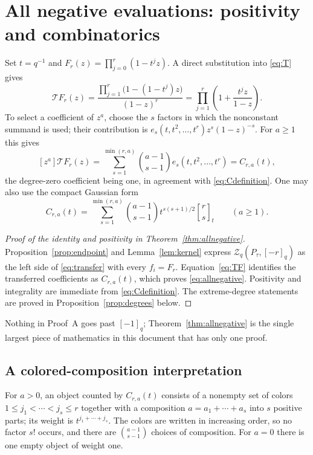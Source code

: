 \documentclass[11pt]{article}
\numberwithin{equation}{section}
\theoremstyle{definition}
\theoremstyle{remark}
\newcommand{\Tr}{\mathcal T}
\newcommand{\qint}[1]{[#1]_q}
\newcommand{\Zeta}{\mathcal Z}
\newcommand{\gausstbinom}[2]{\genfrac{[}{]}{0pt}{}{#1}{#2}_{t}}
\begin{document}
\section{All negative evaluations: positivity and combinatorics}
\label{sec:negative}

Set $t=q^{-1}$ and $F_r(z)=\prod_{j=0}^r(1-t^jz)$. A direct substitution into
\eqref{eq:T} gives
\begin{equation}
 \Tr F_r(z)
 =\frac{\prod_{j=1}^r\bigl(1-(1-t^j)z\bigr)}{(1-z)^r}
 =\prod_{j=1}^r\left(1+\frac{t^jz}{1-z}\right).
 \label{eq:TF}
\end{equation}
To select a coefficient of $z^a$, choose the $s$ factors in which the
nonconstant summand is used; their contribution is
$e_s(t,t^2,\ldots,t^r)z^s(1-z)^{-s}$. For $a\ge1$ this gives
\[
 [z^a]\Tr F_r(z)=\sum_{s=1}^{\min(r,a)}\binom{a-1}{s-1}e_s(t,t^2,\ldots,t^r)
 =C_{r,a}(t),
\]
the degree-zero coefficient being one, in agreement with
\eqref{eq:Cdefinition}. One may also use the compact Gaussian form
\begin{equation}
 C_{r,a}(t)=\sum_{s=1}^{\min(r,a)}
 \binom{a-1}{s-1}t^{s(s+1)/2}\gausstbinom rs\qquad(a\ge1).
 \label{eq:Cgaussian}
\end{equation}

\begin{proof}[Proof of the identity and positivity in Theorem~\ref{thm:allnegative}]
Proposition~\ref{prop:endpoint} and Lemma~\ref{lem:kernel} express
$\Zeta_q(P_\tau,\qint{-r})$ as the left side of \eqref{eq:transfer} with every
$f_i=F_r$. Equation~\eqref{eq:TF} identifies the transferred coefficients as
$C_{r,a}(t)$, which proves \eqref{eq:allnegative}. Positivity and integrality
are immediate from \eqref{eq:Cdefinition}. The extreme-degree statements are
proved in Proposition~\ref{prop:degrees} below.
\end{proof}

Nothing in Proof~A goes past $\qint{-1}$; Theorem~\ref{thm:allnegative} is the
single largest piece of mathematics in this document that has only one proof.

\subsection{A colored-composition interpretation}

For $a>0$, an object counted by $C_{r,a}(t)$ consists of a nonempty set of
colors $1\le j_1<\cdots<j_s\le r$ together with a composition
$a=a_1+\cdots+a_s$ into $s$ positive parts; its weight is
$t^{j_1+\cdots+j_s}$. The colors are written in increasing order, so no factor
$s!$ occurs, and there are $\binom{a-1}{s-1}$ choices of composition. For
$a=0$ there is one empty object of weight one.
\end{document}
